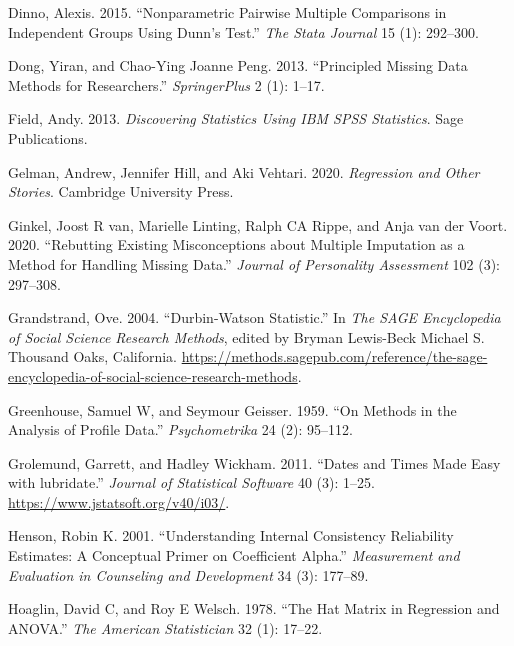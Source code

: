 \documentclass[
  letterpaper,
]{krantz}
\newlength{\cslhangindent}
\newenvironment{CSLReferences}[2] %
 {\begin{list}{}{%
  \setlength{\itemindent}{0pt}
  \setlength{\leftmargin}{0pt}
  \setlength{\parsep}{0pt}
  \ifodd #1
   \setlength{\leftmargin}{\cslhangindent}
   \setlength{\itemindent}{-1\cslhangindent}
  \fi
  \setlength{\itemsep}{#2\baselineskip}}}
 {\end{list}}
\begin{document}
\begin{CSLReferences}{1}{0}
Dinno, Alexis. 2015. {``Nonparametric Pairwise Multiple Comparisons in
Independent Groups Using Dunn's Test.''} \emph{The Stata Journal} 15
(1): 292--300.

Dong, Yiran, and Chao-Ying Joanne Peng. 2013. {``Principled Missing Data
Methods for Researchers.''} \emph{SpringerPlus} 2 (1): 1--17.

Field, Andy. 2013. \emph{Discovering Statistics Using IBM SPSS
Statistics}. Sage Publications.

Gelman, Andrew, Jennifer Hill, and Aki Vehtari. 2020. \emph{Regression
and Other Stories}. Cambridge University Press.

Ginkel, Joost R van, Marielle Linting, Ralph CA Rippe, and Anja van der
Voort. 2020. {``Rebutting Existing Misconceptions about Multiple
Imputation as a Method for Handling Missing Data.''} \emph{Journal of
Personality Assessment} 102 (3): 297--308.

Grandstrand, Ove. 2004. {``Durbin-Watson Statistic.''} In \emph{The SAGE
Encyclopedia of Social Science Research Methods}, edited by Bryman
Lewis-Beck Michael S. Thousand Oaks, California.
\url{https://methods.sagepub.com/reference/the-sage-encyclopedia-of-social-science-research-methods}.

Greenhouse, Samuel W, and Seymour Geisser. 1959. {``On Methods in the
Analysis of Profile Data.''} \emph{Psychometrika} 24 (2): 95--112.

Grolemund, Garrett, and Hadley Wickham. 2011. {``Dates and Times Made
Easy with {lubridate}.''} \emph{Journal of Statistical Software} 40 (3):
1--25. \url{https://www.jstatsoft.org/v40/i03/}.

Henson, Robin K. 2001. {``Understanding Internal Consistency Reliability
Estimates: A Conceptual Primer on Coefficient Alpha.''}
\emph{Measurement and Evaluation in Counseling and Development} 34 (3):
177--89.

Hoaglin, David C, and Roy E Welsch. 1978. {``The Hat Matrix in
Regression and ANOVA.''} \emph{The American Statistician} 32 (1):
17--22.


\end{CSLReferences}
\end{document}
